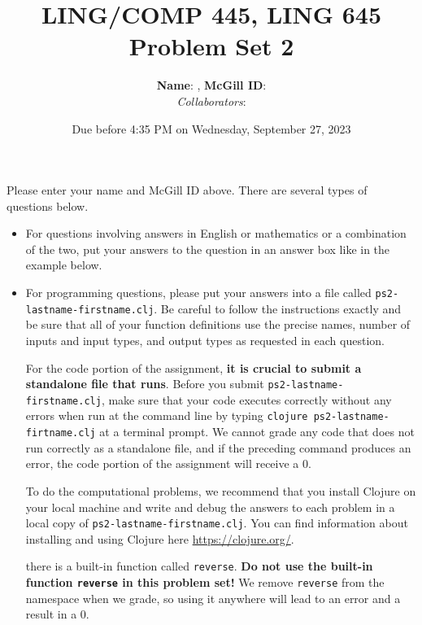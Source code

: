 \documentclass[10pt]{article}
\author{
  \textbf{Name}:       %
, \textbf{McGill ID}:  %
\\ \textit{Collaborators}:  %
}
\newcommand{\PSnum}{2}
\begin{document}
\title{LING/COMP 445, LING 645\\Problem Set \PSnum}
\date{Due before 4:35 PM on Wednesday, September 27, 2023}
\maketitle

Please enter your name and McGill ID above.  There are several types of questions
below.

\begin{itemize}
  \item For questions involving answers in English or mathematics or a
    combination of the two, put your answers to the question in an answer box
    like in the example below.
  \item For programming questions, please put your answers into a file called
    \texttt{ps\PSnum-lastname-firstname.clj}. Be careful to follow the
    instructions exactly and be sure that all of your function definitions use
    the precise names, number of inputs and input types, and output types as
    requested in each question.

    For the code portion of the assignment, \textbf{it is crucial to submit a
    standalone file that runs}. Before you submit
    \texttt{ps\PSnum-lastname-firstname.clj},  make sure that your code executes
    correctly without any errors  when run at the command line by typing
    \texttt{clojure ps\PSnum-lastname-firtname.clj} at a terminal prompt. We
    cannot grade any code that does not run correctly as a standalone file, and
    if the preceding command produces an error, the code portion of the
    assignment will receive a $0$.

    To do the computational problems, we recommend that you install Clojure on
    your local machine and write and debug the answers to each problem in a
    local copy of \texttt{ps\PSnum-lastname-firstname.clj}. You can find
    information about installing and using Clojure here
    \url{https://clojure.org/}.

    {\color{red}{Note} there is a built-in function called \texttt{reverse}.
      \textbf{Do not use the built-in function \texttt{reverse} in this problem
      set!} We remove \texttt{reverse} from the namespace when we grade, so
    using it anywhere will lead to an error and a result in a $0$.}
\end{itemize}
\end{document}
